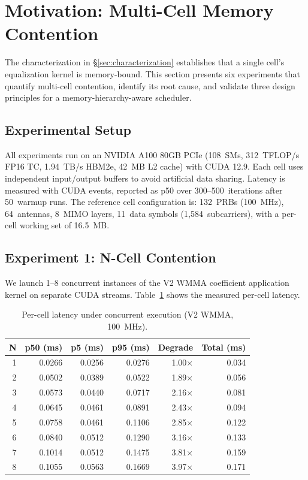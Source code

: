\section{Motivation: Multi-Cell Memory Contention}
\label{sec:motivation}

The characterization in \S\ref{sec:characterization} establishes that a single cell's equalization kernel is memory-bound. This section presents six experiments that quantify multi-cell contention, identify its root cause, and validate three design principles for a memory-hierarchy-aware scheduler.

\subsection{Experimental Setup}
\label{sec:setup}

All experiments run on an NVIDIA A100 80GB PCIe (108~SMs, 312~TFLOP/s FP16 TC, 1.94~TB/s HBM2e, 42~MB L2 cache) with CUDA 12.9. Each cell uses independent input/output buffers to avoid artificial data sharing. Latency is measured with CUDA events, reported as p50 over 300--500~iterations after 50~warmup runs. The reference cell configuration is: 132~PRBs (100~MHz), 64~antennas, 8~MIMO layers, 11~data symbols (1,584~subcarriers), with a per-cell working set of 16.5~MB.

\subsection{Experiment 1: N-Cell Contention}
\label{sec:exp1}

We launch 1--8 concurrent instances of the V2 WMMA coefficient application kernel on separate CUDA streams. Table~\ref{tab:contention} shows the measured per-cell latency.

\begin{table}[h]
\centering
\small
\caption{Per-cell latency under concurrent execution (V2 WMMA, 100~MHz).}
\label{tab:contention}
\begin{tabular}{@{}rrrrrr@{}}
\toprule
N & p50 (ms) & p5 (ms) & p95 (ms) & Degrade & Total (ms) \\
\midrule
1 & 0.0266 & 0.0256 & 0.0276 & 1.00$\times$ & 0.034 \\
2 & 0.0502 & 0.0389 & 0.0522 & 1.89$\times$ & 0.056 \\
3 & 0.0573 & 0.0440 & 0.0717 & 2.16$\times$ & 0.081 \\
4 & 0.0645 & 0.0461 & 0.0891 & 2.43$\times$ & 0.094 \\
5 & 0.0758 & 0.0461 & 0.1106 & 2.85$\times$ & 0.122 \\
6 & 0.0840 & 0.0512 & 0.1290 & 3.16$\times$ & 0.133 \\
7 & 0.1014 & 0.0512 & 0.1475 & 3.81$\times$ & 0.159 \\
8 & 0.1055 & 0.0563 & 0.1669 & 3.97$\times$ & 0.171 \\
\bottomrule
\end{tabular}
\end{table}

